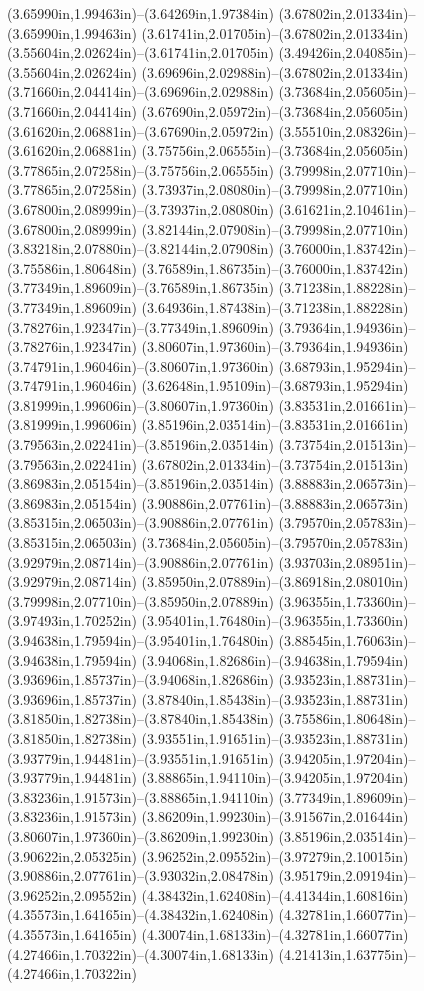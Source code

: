 (3.65990in,1.99463in)--(3.64269in,1.97384in) (3.67802in,2.01334in)--(3.65990in,1.99463in) (3.61741in,2.01705in)--(3.67802in,2.01334in) (3.55604in,2.02624in)--(3.61741in,2.01705in) (3.49426in,2.04085in)--(3.55604in,2.02624in) (3.69696in,2.02988in)--(3.67802in,2.01334in) (3.71660in,2.04414in)--(3.69696in,2.02988in) (3.73684in,2.05605in)--(3.71660in,2.04414in) (3.67690in,2.05972in)--(3.73684in,2.05605in) (3.61620in,2.06881in)--(3.67690in,2.05972in) (3.55510in,2.08326in)--(3.61620in,2.06881in) (3.75756in,2.06555in)--(3.73684in,2.05605in) (3.77865in,2.07258in)--(3.75756in,2.06555in) (3.79998in,2.07710in)--(3.77865in,2.07258in) (3.73937in,2.08080in)--(3.79998in,2.07710in) (3.67800in,2.08999in)--(3.73937in,2.08080in) (3.61621in,2.10461in)--(3.67800in,2.08999in) (3.82144in,2.07908in)--(3.79998in,2.07710in) (3.83218in,2.07880in)--(3.82144in,2.07908in) (3.76000in,1.83742in)--(3.75586in,1.80648in) (3.76589in,1.86735in)--(3.76000in,1.83742in) (3.77349in,1.89609in)--(3.76589in,1.86735in) (3.71238in,1.88228in)--(3.77349in,1.89609in) (3.64936in,1.87438in)--(3.71238in,1.88228in) (3.78276in,1.92347in)--(3.77349in,1.89609in) (3.79364in,1.94936in)--(3.78276in,1.92347in) (3.80607in,1.97360in)--(3.79364in,1.94936in) (3.74791in,1.96046in)--(3.80607in,1.97360in) (3.68793in,1.95294in)--(3.74791in,1.96046in) (3.62648in,1.95109in)--(3.68793in,1.95294in) (3.81999in,1.99606in)--(3.80607in,1.97360in) (3.83531in,2.01661in)--(3.81999in,1.99606in) (3.85196in,2.03514in)--(3.83531in,2.01661in) (3.79563in,2.02241in)--(3.85196in,2.03514in) (3.73754in,2.01513in)--(3.79563in,2.02241in) (3.67802in,2.01334in)--(3.73754in,2.01513in) (3.86983in,2.05154in)--(3.85196in,2.03514in) (3.88883in,2.06573in)--(3.86983in,2.05154in) (3.90886in,2.07761in)--(3.88883in,2.06573in) (3.85315in,2.06503in)--(3.90886in,2.07761in) (3.79570in,2.05783in)--(3.85315in,2.06503in) (3.73684in,2.05605in)--(3.79570in,2.05783in) (3.92979in,2.08714in)--(3.90886in,2.07761in) (3.93703in,2.08951in)--(3.92979in,2.08714in) (3.85950in,2.07889in)--(3.86918in,2.08010in) (3.79998in,2.07710in)--(3.85950in,2.07889in) (3.96355in,1.73360in)--(3.97493in,1.70252in) (3.95401in,1.76480in)--(3.96355in,1.73360in) (3.94638in,1.79594in)--(3.95401in,1.76480in) (3.88545in,1.76063in)--(3.94638in,1.79594in) (3.94068in,1.82686in)--(3.94638in,1.79594in) (3.93696in,1.85737in)--(3.94068in,1.82686in) (3.93523in,1.88731in)--(3.93696in,1.85737in) (3.87840in,1.85438in)--(3.93523in,1.88731in) (3.81850in,1.82738in)--(3.87840in,1.85438in) (3.75586in,1.80648in)--(3.81850in,1.82738in) (3.93551in,1.91651in)--(3.93523in,1.88731in) (3.93779in,1.94481in)--(3.93551in,1.91651in) (3.94205in,1.97204in)--(3.93779in,1.94481in) (3.88865in,1.94110in)--(3.94205in,1.97204in) (3.83236in,1.91573in)--(3.88865in,1.94110in) (3.77349in,1.89609in)--(3.83236in,1.91573in) (3.86209in,1.99230in)--(3.91567in,2.01644in) (3.80607in,1.97360in)--(3.86209in,1.99230in) (3.85196in,2.03514in)--(3.90622in,2.05325in) (3.96252in,2.09552in)--(3.97279in,2.10015in) (3.90886in,2.07761in)--(3.93032in,2.08478in) (3.95179in,2.09194in)--(3.96252in,2.09552in) (4.38432in,1.62408in)--(4.41344in,1.60816in) (4.35573in,1.64165in)--(4.38432in,1.62408in) (4.32781in,1.66077in)--(4.35573in,1.64165in) (4.30074in,1.68133in)--(4.32781in,1.66077in) (4.27466in,1.70322in)--(4.30074in,1.68133in) (4.21413in,1.63775in)--(4.27466in,1.70322in) 